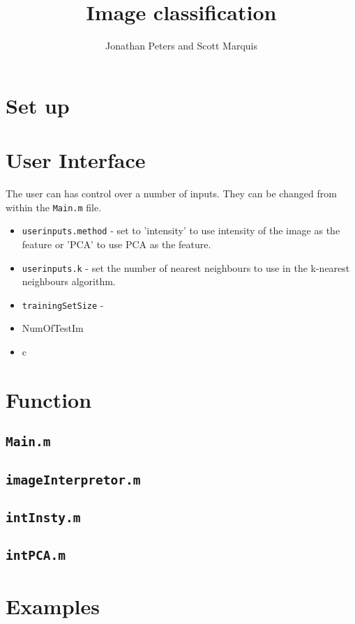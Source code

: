 \documentclass[10pt]{article}
\title{Image classification}
\author{Jonathan Peters and Scott Marquis}
\date{}
\begin{document}
 

\maketitle

\section{Set up} 


\section{User Interface} 
The user can has control over a number of inputs. They can be changed from within the {\tt Main.m} file.  
\begin{itemize}
\setlength\itemsep{0 cm}
\item {\tt userinputs.method} - set to 'intensity' to use intensity of the image as the feature or 'PCA' to use PCA as the feature. 
\item {\tt userinputs.k} - set the number of nearest neighbours to use in the k-nearest neighbours algorithm.  
\item {\tt trainingSetSize} - 
\item NumOfTestIm 
\item c 
\end{itemize}

\section{Function} 

\subsection{\tt Main.m} 

\subsection{\tt imageInterpretor.m} 

\subsection{\tt intInsty.m} 

\subsection{\tt intPCA.m}

\section{Examples}
\end{document}

